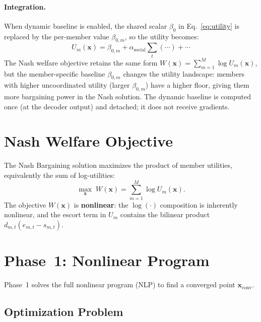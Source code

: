 \documentclass[11pt,a4paper]{article}
\newcommand{\xconv}{\mathbf{x}_{\mathrm{conv}}}
\begin{document}
\paragraph{Integration.}
When dynamic baseline is enabled, the shared scalar $\beta_0$ in Eq.~\eqref{eq:utility} is replaced by the per-member value $\beta_{0,m}$, so the utility becomes:
\begin{equation}
    U_m(\mathbf{x}) = \beta_{0,m} + \alpha_{\mathrm{social}} \sum_t (\cdots) + \cdots
    \label{eq:utility_dynamic}
\end{equation}
The Nash welfare objective retains the same form $W(\mathbf{x}) = \sum_{m=1}^{M} \log U_m(\mathbf{x})$, but the member-specific baseline $\beta_{0,m}$ changes the utility landscape: members with higher uncoordinated utility (larger $\beta_{0,m}$) have a higher floor, giving them more bargaining power in the Nash solution.
The dynamic baseline is computed once (at the decoder output) and detached; it does not receive gradients.


\section{Nash Welfare Objective}

The Nash Bargaining solution maximizes the product of member utilities, equivalently the sum of log-utilities:
\begin{equation}
    \max_{\mathbf{x}} \; W(\mathbf{x}) = \sum_{m=1}^{M} \log U_m(\mathbf{x}).
    \label{eq:nash_welfare}
\end{equation}
The objective $W(\mathbf{x})$ is \textbf{nonlinear}: the $\log(\cdot)$ composition is inherently nonlinear, and the escort term in $U_m$ contains the bilinear product $d_{m,t}(e_{m,t} - s_{m,t})$.


\section{Phase~1: Nonlinear Program}
\label{sec:phase1}

Phase~1 solves the full nonlinear program (NLP) to find a converged point $\xconv$.

\subsection{Optimization Problem}
\end{document}
